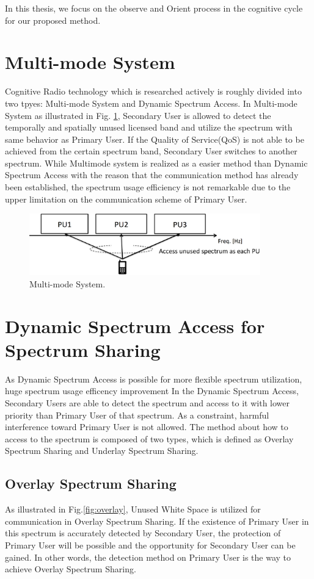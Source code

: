 In this thesis, we focus on the observe and Orient process in the cognitive cycle for our proposed method.

\section{Multi-mode System}
Cognitive Radio technology which is researched actively is roughly divided into two tpyes: Multi-mode System and Dynamic Spectrum Access. In Multi-mode System as illustrated in Fig. \ref{fig:hetero}, Secondary User is allowed to detect the temporally and spatially unused licensed band and utilize the spectrum with same behavior as Primary User. If the Quality of Service(QoS) is not able to be achieved from the certain spectrum band, Secondary User switches to another spectrum. While Multimode system is realized as a easier method than Dynamic Spectrum Access with the reason that the communication method has already been established, the spectrum usage efficiency is not remarkable due to the upper limitation on the communication scheme of Primary User.

\begin{figure}[!htp]
\begin{center}
\includegraphics[width=100mm,clip]{multimode.eps}
\caption{Multi-mode System.}
\label{fig:hetero}
\end{center}
\end{figure}

\section{Dynamic Spectrum Access for Spectrum Sharing}
As Dynamic Spectrum Access is possible for more flexible spectrum utilization, huge spectrum usage efficency improvement In the Dynamic Spectrum Access, Secondary Users are able to detect the spectrum and access to it with lower priority than Primary User of that spectrum. As a constraint, harmful interference toward Primary User is not allowed. The method about how to access to the spectrum is composed of two types, which is defined as Overlay Spectrum Sharing\cite{ref:overlay} and Underlay Spectrum Sharing\cite{ref:underlay}.

\subsection{Overlay Spectrum Sharing}
As illustrated in Fig.\ref{fig:overlay}, Unused White Space is utilized for communication in Overlay Spectrum Sharing. If the existence of Primary User in this spectrum is accurately detected by Secondary User, the protection of Primary User will be possible and the opportunity for Secondary User can be gained. In other words, the detection method on Primary User is  the way to achieve Overlay Spectrum Sharing.
    
